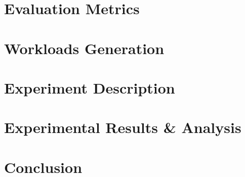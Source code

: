 \documentclass[paper=a4, fontsize=11pt]{scrartcl} %
\numberwithin{equation}{section} %
\numberwithin{figure}{section} %
\numberwithin{table}{section} %
\begin{document}
\section{Evaluation Metrics}

\section{Workloads Generation}

\section{Experiment Description}

\section{Experimental Results \& Analysis}

\section{Conclusion}
\end{document}
